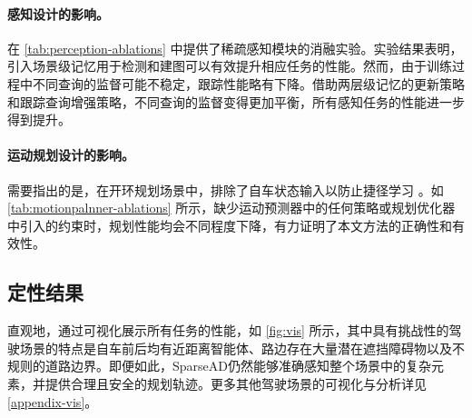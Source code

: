 

\paragraph{\textbf{感知设计的影响。}} 在 \cref{tab:perception-ablations} 中提供了稀疏感知模块的消融实验。实验结果表明，引入场景级记忆用于检测和建图可以有效提升相应任务的性能。然而，由于训练过程中不同查询的监督可能不稳定，跟踪性能略有下降。借助两层级记忆的更新策略和跟踪查询增强策略，不同查询的监督变得更加平衡，所有感知任务的性能进一步得到提升。

\label{abalation:perceptrion}



\paragraph{\textbf{运动规划设计的影响。}} 需要指出的是，在开环规划场景中，排除了自车状态输入以防止捷径学习 \cite{li2023ego}。如 \cref{tab:motionpalnner-ablations} 所示，缺少运动预测器中的任何策略或规划优化器中引入的约束时，规划性能均会不同程度下降，有力证明了本文方法的正确性和有效性。

\label{abalation:planning}

\subsection{定性结果}


直观地，通过可视化展示所有任务的性能，如 \cref{fig:vis} 所示，其中具有挑战性的驾驶场景的特点是自车前后均有近距离智能体、路边存在大量潜在遮挡障碍物以及不规则的道路边界。即便如此，SparseAD仍然能够准确感知整个场景中的复杂元素，并提供合理且安全的规划轨迹。更多其他驾驶场景的可视化与分析详见 \cref{appendix-vis}。
